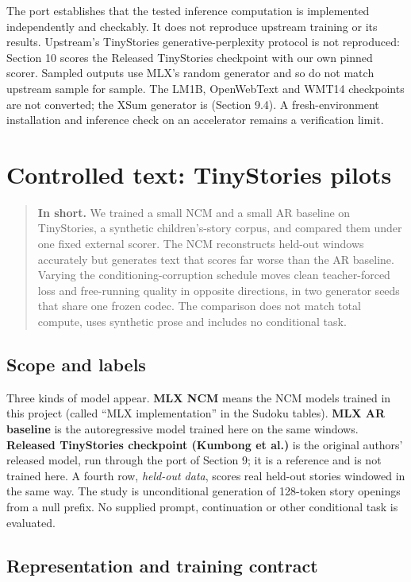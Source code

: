\documentclass[
  british,
]{article}
\begin{document}
The port establishes that the tested inference computation is
implemented independently and checkably. It does not reproduce upstream
training or its results. Upstream's TinyStories generative-perplexity
protocol is not reproduced: Section 10 scores the Released TinyStories
checkpoint with our own pinned scorer. Sampled outputs use MLX's random
generator and so do not match upstream sample for sample. The LM1B,
OpenWebText and WMT14 checkpoints are not converted; the XSum generator
is (Section 9.4). A fresh-environment installation and inference check
on an accelerator remains a verification limit.

\section{Controlled text: TinyStories
pilots}\label{controlled-text-tinystories-pilots}

\begin{quote}
\textbf{In short.} We trained a small NCM and a small AR baseline on
TinyStories, a synthetic children's-story corpus, and compared them
under one fixed external scorer. The NCM reconstructs held-out windows
accurately but generates text that scores far worse than the AR
baseline. Varying the conditioning-corruption schedule moves clean
teacher-forced loss and free-running quality in opposite directions, in
two generator seeds that share one frozen codec. The comparison does not
match total compute, uses synthetic prose and includes no conditional
task.
\end{quote}

\subsection{Scope and labels}\label{scope-and-labels}

Three kinds of model appear. \textbf{MLX NCM} means the NCM models
trained in this project (called ``MLX implementation'' in the Sudoku
tables). \textbf{MLX AR baseline} is the autoregressive model trained
here on the same windows. \textbf{Released TinyStories checkpoint
(Kumbong et al.)} is the original authors' released model, run through
the port of Section 9; it is a reference and is not trained here. A
fourth row, \emph{held-out data}, scores real held-out stories windowed
in the same way. The study is unconditional generation of 128-token
story openings from a null prefix. No supplied prompt, continuation or
other conditional task is evaluated.

\subsection{Representation and training
contract}\label{representation-and-training-contract}
\end{document}
